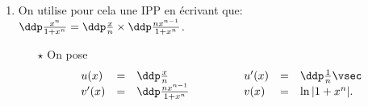 \documentclass[a4paper, 11pt,reqno]{article}
\begin{document}
\begin{correction}
\begin{enumerate}
\begin{enumerate}
\begin{itemize}
\begin{itemize}
					                        \begin{itemize}
						                        \item[$\circ$] Les fonctions $x\mapsto \ddp\frac{x^n}{2}$, $x\mapsto x^n$ et $x\mapsto \ddp\frac{x^n}{1+x^n}$ sont continues sur $\lbrack 0,1\rbrack$ comme quotient de fonctions continues.
						                        \item[$\circ$] $0\leq 1$
						                        \item[$\circ$] Pour tout $x\in\lbrack 0,1\rbrack$: $\ddp\frac{x^n}{2}\leq \ddp\frac{x^n}{1+x^n}\leq x^n$.
					                        \end{itemize}
					                        Ainsi en utilisant le th\'eor\`{e}me de croissance de l'int\'egrale, on obtient que: $\ddp\frac{1}{2(n+1)}\leq 1-u_n\leq \ddp\frac{1}{n+1}$. Comme $\ddp\frac{1}{2(n+1)} \geq 0$, on a bien que: $0\leq 1-u_n\leq \ddp\frac{1}{n+1}$.
				                  \end{itemize}
				            \item[$\bullet$] Convergence de la suite: On a:
				                  \begin{itemize}
					                  \item[$\star$] Pour tout $n\in\N$: $0\leq 1-u_n\leq \ddp\frac{1}{n+1} $.
					                  \item[$\star$] $\lim\limits_{n\to +\infty} 0=\lim\limits_{n\to +\infty} \ddp\frac{1}{n+1}=0$ par propri\'et\'e sur le quotient de limite.
				                  \end{itemize}
				                  Ainsi d'apr\`{e}s le th\'eor\`{e}me des gendarmes, on obtient que: $\lim\limits_{n\to +\infty} 1-u_n=0$, \`{a} savoir: $\lim\limits_{n\to +\infty} u_n=1$. La suite $(u_n)_{n\in\N^{\star}}$ est donc convergente et elle converge vers 1.
			            \end{itemize}
			      \item On utilise pour cela une IPP en \'ecrivant que: $\ddp\frac{x^n}{1+x^n}=\ddp\frac{x}{n}\times \ddp\frac{nx^{n-1}}{1+x^n}$.
			            \begin{itemize}
				            \item[$\star$] On pose
				                  $$\begin{array}{lllllll}
						                  u(x)          & = & \ddp\frac{x}{n}            & \hspace{1cm} & u^{\prime}(x) & = & \ddp\frac{1}{n} \vsec \\
						                  v^{\prime}(x) & = & \ddp\frac{nx^{n-1}}{1+x^n} & \hspace{1cm} & v(x)          & = & \ln{|1+x^n|}.

\end{array}$$
\end{itemize}
\end{enumerate}
\end{enumerate}
\end{correction}
\end{document}
